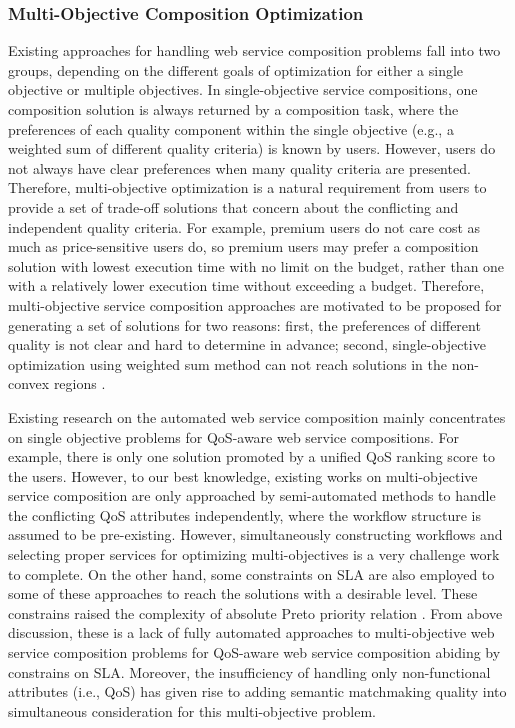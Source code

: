 \subsubsection{Multi-Objective Composition Optimization}
Existing approaches for handling web service composition problems fall into two groups, depending on the different goals of optimization for either a single objective or multiple objectives. In single-objective service compositions, one composition solution is always returned by a composition task, where the preferences of each quality component within the single objective (e.g., a weighted sum of different quality criteria) is known by users. However, users do not always have clear preferences when many quality criteria are presented. Therefore, multi-objective optimization is a natural requirement from users to provide a set of trade-off solutions that concern about the conflicting and independent quality criteria. For example, premium users do not care cost as much as price-sensitive users do, so premium users may prefer a composition solution with lowest execution time with no limit on the budget,  rather than one with a relatively lower execution time without exceeding a budget. Therefore, multi-objective service composition approaches are motivated to be proposed for generating a set of solutions for two reasons: first, the preferences of different quality is not clear and hard to determine in advance; second, single-objective optimization using weighted sum method can not reach solutions in the non-convex regions \cite{kim2006adaptive}.  

Existing research on the automated web service composition mainly concentrates on single objective problems for QoS-aware web service compositions. For example, there is only one solution promoted by a unified QoS ranking score to the users. However, to our best knowledge, existing works on multi-objective service composition \cite{liu2005dynamic,wada2012e3,yao2009qos,yin2014hybrid} are only approached by semi-automated methods to handle the conflicting QoS attributes independently, where the workflow structure is assumed to be pre-existing. However, simultaneously constructing workflows and selecting proper services for optimizing multi-objectives is a very challenge work to complete. On the other hand, some constraints on SLA are also employed to some of these approaches to reach the solutions with a desirable level. These constrains raised the complexity of absolute Preto priority relation \cite{garey1979guide}. From above discussion, these is a lack of fully automated approaches to multi-objective web service composition problems for QoS-aware web service composition abiding by constrains on SLA. Moreover, the insufficiency of handling only non-functional attributes (i.e., QoS) has given rise to adding semantic matchmaking quality into simultaneous consideration for this multi-objective problem.

